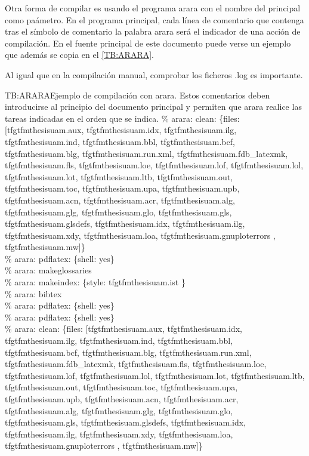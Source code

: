 Otra forma de compilar es usando el programa arara con el nombre del principal como paámetro. En el programa principal, cada línea de comentario que contenga tras el símbolo de comentario la palabra arara será el indicador de una acción de compilación. En el fuente principal de este documento puede verse un ejemplo que además se copia en el \cref{TB:ARARA}.

Al igual que en la compilación manual, comprobar los ficheros .log es importante.

\begin{textbox}{TB:ARARA}{Ejemplo de compilación con arara. Estos comentarios deben introducirse al principio del documento principal y permiten que arara realice las tareas indicadas en el orden que se indica.}
\% arara: clean: \{files: [tfgtfmthesisuam.aux, tfgtfmthesisuam.idx, tfgtfmthesisuam.ilg, tfgtfmthesisuam.ind, tfgtfmthesisuam.bbl, tfgtfmthesisuam.bcf, tfgtfmthesisuam.blg, tfgtfmthesisuam.run.xml, tfgtfmthesisuam.fdb\_latexmk, tfgtfmthesisuam.fls, tfgtfmthesisuam.loe, tfgtfmthesisuam.lof, tfgtfmthesisuam.lol, tfgtfmthesisuam.lot, tfgtfmthesisuam.ltb, tfgtfmthesisuam.out, tfgtfmthesisuam.toc, tfgtfmthesisuam.upa, tfgtfmthesisuam.upb, tfgtfmthesisuam.acn, tfgtfmthesisuam.acr, tfgtfmthesisuam.alg, tfgtfmthesisuam.glg, tfgtfmthesisuam.glo, tfgtfmthesisuam.gls, tfgtfmthesisuam.glsdefs, tfgtfmthesisuam.idx,  tfgtfmthesisuam.ilg, tfgtfmthesisuam.xdy, tfgtfmthesisuam.loa, tfgtfmthesisuam.gnuploterrors , tfgtfmthesisuam.mw]\} \\
\% arara: pdflatex: \{shell: yes\} \\
\% arara: makeglossaries \\
\% arara: makeindex: \{style: tfgtfmthesisuam.ist \} \\
\% arara: bibtex \\
\% arara: pdflatex: \{shell: yes\} \\
\% arara: pdflatex: \{shell: yes\} \\
\% arara: clean: \{files: [tfgtfmthesisuam.aux, tfgtfmthesisuam.idx, tfgtfmthesisuam.ilg, tfgtfmthesisuam.ind, tfgtfmthesisuam.bbl, tfgtfmthesisuam.bcf, tfgtfmthesisuam.blg, tfgtfmthesisuam.run.xml, tfgtfmthesisuam.fdb\_latexmk, tfgtfmthesisuam.fls, tfgtfmthesisuam.loe, tfgtfmthesisuam.lof, tfgtfmthesisuam.lol, tfgtfmthesisuam.lot, tfgtfmthesisuam.ltb, tfgtfmthesisuam.out, tfgtfmthesisuam.toc, tfgtfmthesisuam.upa, tfgtfmthesisuam.upb, tfgtfmthesisuam.acn, tfgtfmthesisuam.acr, tfgtfmthesisuam.alg, tfgtfmthesisuam.glg, tfgtfmthesisuam.glo, tfgtfmthesisuam.gls, tfgtfmthesisuam.glsdefs, tfgtfmthesisuam.idx,  tfgtfmthesisuam.ilg, tfgtfmthesisuam.xdy, tfgtfmthesisuam.loa, tfgtfmthesisuam.gnuploterrors , tfgtfmthesisuam.mw]\}
\end{textbox}

